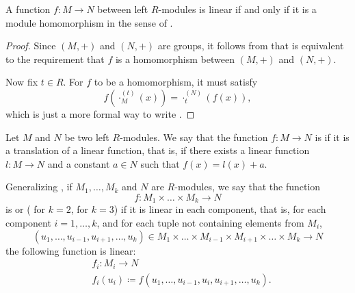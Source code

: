 \begin{proposition}\label{thm:map_is_linear_iff_homomorphism}
  A function \( f: M \to N \) between left \( R \)-modules is linear if and only if it is a module homomorphism in the sense of .
\end{proposition}
\begin{proof}
  Since \( (M, +) \) and \( (N, +) \) are groups, it follows from  that  is equivalent to the requirement that \( f \) is a homomorphism between \( (M, +) \) and \( (N, +) \).

  Now fix \( t \in R \). For \( f \) to be a homomorphism, it must satisfy
  \begin{equation*}
    f(\cdot_M^{(t)}(x)) = \cdot_t^{(N)}(f(x)),
  \end{equation*}
  which is just a more formal way to write .
\end{proof}

\begin{definition}\label{def:affine_operator}
  Let \( M \) and \( N \) be two left \( R \)-modules. We say that the function \( f: M \to N \) is  if it is a translation of a linear function, that is, if there exists a linear function \( l: M \to N \) and a constant \( a \in N \) such that \( f(x) = l(x) + a \).
\end{definition}

\begin{definition}\label{def:multilinear_function}
  Generalizing , if \( M_1, \ldots, M_k \) and \( N \) are \( R \)-modules, we say that the function
  \begin{equation*}
    f: M_1 \times \ldots \times M_k \to N
  \end{equation*}
  is  or  ( for \( k = 2 \),  for \( k = 3 \)) if it is linear in each component, that is, for each component \( i = 1, \ldots, k \), and for each tuple not containing elements from \( M_i \),
  \begin{equation*}
    (u_1, \ldots, u_{i-1}, u_{i+1}, \ldots, u_k) \in M_1 \times \ldots \times M_{i-1} \times M_{i+1} \times \ldots \times M_k \to N
  \end{equation*}
  the following function is linear:
  \begin{align*}
    &f_i: M_i \to N \\
    &f_i(u_i) \coloneqq f(u_1, \ldots, u_{i-1}, u_i, u_{i+1}, \ldots, u_k).
  \end{align*}
\end{definition}

